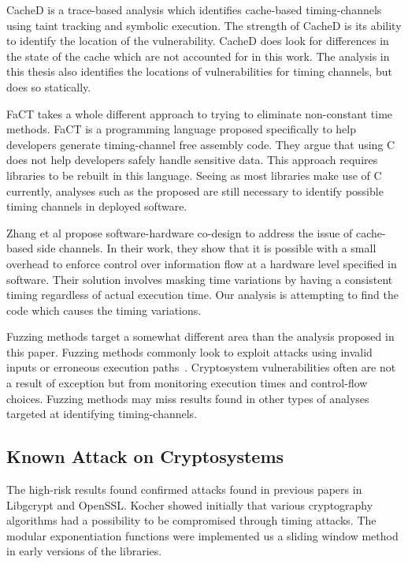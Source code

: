    CacheD is a trace-based analysis which identifies cache-based timing-channels
   using taint tracking and symbolic execution\cite{wang2017cached}. The
   strength of CacheD is its ability to identify the location of the
   vulnerability. CacheD does look for differences in the state of the cache
   which are not accounted for in this work. The analysis in this thesis also
   identifies the locations of vulnerabilities for timing channels, but does so
   statically.

   FaCT takes a whole different approach to trying to eliminate non-constant
   time methods\cite{cauligi2017fact}. FaCT is a programming language proposed
   specifically to help developers generate timing-channel free assembly code.
   They argue that using C does not help developers safely handle sensitive
   data. This approach requires libraries to be rebuilt in this language. Seeing
   as most libraries make use of C currently, analyses such as the proposed are
   still necessary to identify possible timing channels in deployed software.

   Zhang et al propose software-hardware co-design to address the issue of
   cache-based side channels\cite{zhang2015hardware}. In their work, they show
   that it is possible with a small overhead to enforce control over information
   flow at a hardware level specified in software. Their solution involves
   masking time variations by having a consistent timing regardless of actual
   execution time. Our analysis is attempting to find the code which causes the
   timing variations.

   Fuzzing methods target a somewhat different area than the analysis proposed
   in this paper. Fuzzing methods commonly look to exploit attacks using invalid
   inputs or erroneous execution paths~\cite{sutton2007fuzzing}. Cryptosystem vulnerabilities often are
   not a result of exception but from monitoring execution times and
   control-flow choices. Fuzzing methods may miss results found in other types
   of analyses targeted at identifying timing-channels.

\subsection{Known Attack on Cryptosystems}
   The high-risk results found confirmed attacks found in previous papers in
   Libgcrypt and OpenSSL. Kocher showed initially that various cryptography
   algorithms had a possibility to be compromised through timing
   attacks\cite{kochertiming}. The modular exponentiation functions were
   implemented us a sliding window method in early versions of the libraries.

